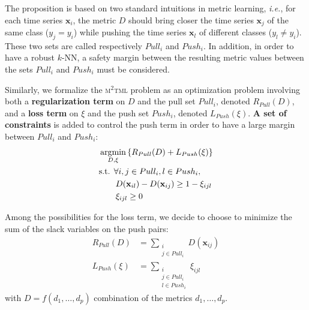The proposition is based on two standard intuitions in metric learning, \textit{i.e.}, for each time series $\textbf{x}_i$, the metric $D$ should bring closer the time series $\textbf{x}_j$ of the same class ($y_j=y_i$) while pushing the time series $\textbf{x}_l$ of different classes ($y_l \neq y_i$). These two sets are called respectively $Pull_i$ and $Push_i$. 
In addition, in order to have a robust $k$-NN, a safety margin between the resulting metric values between the sets $Pull_i$ and $Push_i$ must be considered. 

Similarly, we formalize the \textsc{m$^2$tml} problem as an optimization problem involving both a \textbf{regularization term} on $D$ and the pull set $Pull_i$, denoted $R_{Pull}(D)$, and a \textbf{loss term} on $\xi$ and the push set $Push_i$, denoted $L_{Push}(\xi)$. \textbf{A set of constraints} is added to control the push term in order to have a large margin between $Pull_i$ and $Push_i$:
\begin{equation}
\begin{aligned}
\displaystyle 	& \argmin_{D,\xi} \left\lbrace R_{Pull}(D) + L_{Push}(\xi) \right\rbrace  \\
& \text{s.t. } 	\forall i, j \in Pull_i, l \in Push_i, \\
& \qquad D(\textbf{x}_{il})-D(\textbf{x}_{ij}) \geq 1 - \xi_{ijl} \\
& \qquad \xi_{ijl} \geq 0 
\end{aligned}
\end{equation}

Among the possibilities for the loss term, we decide to choose to minimize the sum of the slack variables on the push pairs: 
\begin{align}
	R_{Pull}(D) 	& = \sum_{\substack{i \\ j \in Pull_i}}D(\textbf{x}_{ij}) \\
	L_{Push}(\xi) 	& = \sum\limits_{\substack{i \\ j \in Pull_i \\ l \in Push_i}} \xi_{ijl}
\end{align}
with $D = f(d_1, \ldots, d_p)$ combination of the metrics $d_1, \ldots, d_p$.


